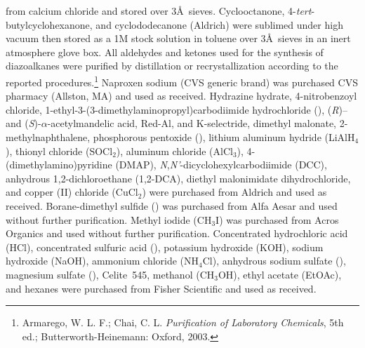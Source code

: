 from calcium chloride and stored over 3\AA\ sieves.
Cyclooctanone, 4-\textit{tert}-butylcyclohexanone, and cyclododecanone (Aldrich) were sublimed under
high vacuum then stored as a 1M stock solution in toluene over 3\AA\  sieves in an inert atmosphere
glove box. All aldehydes and ketones used for the synthesis of diazoalkanes were purified by
distillation or recrystallization according to the reported
procedures.\footnote{{\frenchspacing Armarego, W. L. F.; Chai, C. L. \textit{Purification of
Laboratory Chemicals}, 5th ed.; Butterworth-Heinemann: Oxford, 2003.}} Naproxen sodium (CVS generic
brand) was purchased CVS pharmacy (Allston, MA) and used as received. Hydrazine hydrate,
4-nitrobenzoyl chloride, 1-ethyl-3-(3-dimethylaminopropyl)carbodiimide hydrochloride (), (\textit{R})-- and (\textit{S})-$\alpha$-acetylmandelic acid,
Red-Al, and K-selectride, dimethyl malonate, 2-methylnaphthalene, phosphorous pentoxide (),
lithium aluminum hydride (LiAlH$_4$), thionyl chloride (SOCl$_2$), aluminum chloride (AlCl$_3$),
4-(dimethylamino)pyridine (DMAP), \textit{N},\textit{N'}-dicyclohexylcarbodiimide (DCC), anhydrous
1,2-dichloroethane (1,2-DCA), diethyl malonimidate dihydrochloride, and copper (II) chloride
(CuCl$_2$)  were purchased from Aldrich and used as received. Borane-dimethyl sulfide ()
was purchased from Alfa Aesar and used without further purification. Methyl iodide (CH$_3$I) was
purchased from Acros Organics and used without further purification. Concentrated hydrochloric acid
(HCl), concentrated sulfuric acid (), potassium hydroxide (KOH), sodium hydroxide (NaOH),
ammonium chloride (NH$_4$Cl), anhydrous sodium sulfate (), magnesium sulfate
(), Celite\regtm\ 545, methanol (CH$_3$OH), ethyl acetate (EtOAc), and hexanes were purchased from Fisher Scientific and used as received.

